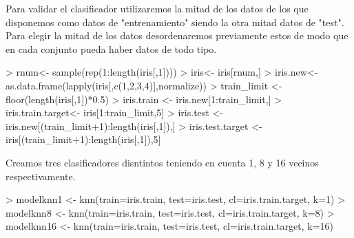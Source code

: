 \documentclass [a4paper] {article}
\begin{document}
Para validar el clasificador utilizaremos la mitad de los datos de los que disponemos como datos de "entrenamiento" siendo la otra mitad datos de "test".
Para elegir la mitad de los datos desordenaremos previamente estos de modo que en cada conjunto pueda haber datos de todo tipo.
\begin{Schunk}
\begin{Sinput}
> rnum<- sample(rep(1:length(iris[,1])))
> iris<- iris[rnum,]
> iris.new<- as.data.frame(lapply(iris[,c(1,2,3,4)],normalize))
> train_limit <- floor(length(iris[,1])*0.5)
> iris.train <- iris.new[1:train_limit,]
> iris.train.target<- iris[1:train_limit,5]
> iris.test <- iris.new[(train_limit+1):length(iris[,1]),]
> iris.test.target <- iris[(train_limit+1):length(iris[,1]),5]
\end{Sinput}
\end{Schunk}

Creamos tres clasificadores disntintos teniendo en cuenta 1, 8 y 16 vecinos respectivamente.
\begin{Schunk}
\begin{Sinput}
> modelknn1 <- knn(train=iris.train, test=iris.test, cl=iris.train.target, k=1)
> modelknn8 <- knn(train=iris.train, test=iris.test, cl=iris.train.target, k=8)
> modelknn16 <- knn(train=iris.train, test=iris.test, cl=iris.train.target, k=16)
\end{Sinput}
\end{Schunk}
\end{document}
